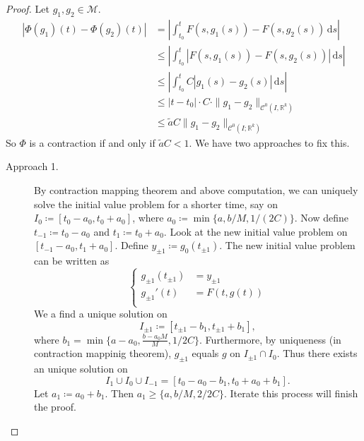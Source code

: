 \documentclass[12pt]{article}
\theoremstyle{plain}
\theoremstyle{definition}
\begin{document}
\begin{proof}
    Let $g_1,g_2\in\mathcal{M}$.
    $$\begin{aligned}
        |\Phi(g_1)(t)-\Phi(g_2)(t)|
        &=\left|\int_{t_0}^tF(s,g_1(s)) - F(s,g_2(s))\,\mathrm{d}s\right|\\
        &\leq \left|\int_{t_0}^t |F(s,g_1(s)) -F(s,g_2(s))|\,\mathrm{d}s\right|\\
        &\leq \left|\int_{t_0}^t C|g_1(s)-g_2(s)|\,\mathrm{d}s\right|\\
        &\leq |t-t_0|\cdot C\cdot \|g_1-g_2\|_{\mathcal{C}^0(I,\mathbb{R}^k)}\\
        &\leq \tilde{a} C\|g_1-g_2\|_{\mathcal{C}^0(I;\mathbb{R}^k)}
    \end{aligned}$$
    So $\Phi$ is a contraction if and only if $\tilde{a}C<1$.
    We have two approaches to fix this.
    \begin{description}
        \item[Approach 1.]
        By contraction mapping theorem and above computation, we can uniquely
        solve the initial value problem for a shorter time, say on
        $I_0\coloneqq[t_0-a_0,t_0+a_0]$, where $a_0\coloneqq\min\{a,b/M,1/(2C)\}$.
        Now define $t_{-1}\coloneqq t_0-a_0$ and $t_{1}\coloneqq t_0+a_0$.
        Look at the new initial value problem on $[t_{-1}-a_0,t_1+a_0]$.
        Define $y_{\pm1}\coloneqq g_0(t_{\pm1})$.
        The new initial value problem can be written as
        $$\left\{
            \begin{aligned}
                g_{\pm1}(t_{\pm1})&=y_{\pm1}\\
                g_{\pm1}'(t)&=F(t,g(t))\\
            \end{aligned}
        \right.$$
        We a find a unique solution on
        $$I_{\pm 1}\coloneqq [t_{\pm1}-b_1, t_{\pm1}+b_1],$$
        where $b_1=\min\{a-a_0,\frac{b-a_0M}{M},1/2C\}$.
        Furthermore, by uniqueness (in contraction mappinig theorem),
        $g_{\pm 1}$ equals $g$ on $I_{\pm1}\cap I_0$.
        Thus there exists an unique solution on 
        $$I_1\cup I_0\cup I_{-1}=[t_0-a_0-b_1,t_0+a_0+b_1].$$
        Let $a_1\coloneqq a_0+b_1$.
        Then $a_1\geq \{a,b/M,2/2C\}$.
        Iterate this process will finish the proof.


\end{description}
\end{proof}
\end{document}
